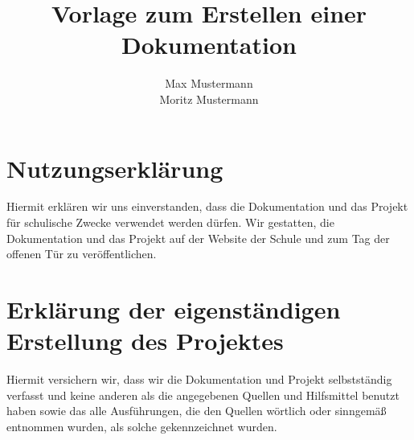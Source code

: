 \documentclass[11pt, oneside, halfparskip, smallheadings, automark]{scrreprt}
\title{Vorlage zum Erstellen einer Dokumentation}
\author{Max Mustermann \\ Moritz Mustermann}
\begin{document}
\maketitle

\tableofcontents










\listoffigures
\listoftables

\chapter*{Nutzungserklärung}
Hiermit erklären wir uns einverstanden, dass die Dokumentation und das Projekt für
schulische Zwecke verwendet werden dürfen.
Wir gestatten, die Dokumentation und das Projekt auf der Website der Schule und zum
Tag der offenen Tür zu veröffentlichen.

\chapter*{Erklärung der eigenständigen Erstellung des Projektes}
Hiermit versichern wir, dass wir die Dokumentation und Projekt selbstständig verfasst und
keine anderen als die angegebenen Quellen und Hilfsmittel benutzt haben sowie das alle
Ausführungen, die den Quellen wörtlich oder sinngemäß entnommen wurden, als solche
gekennzeichnet wurden.
\end{document}
